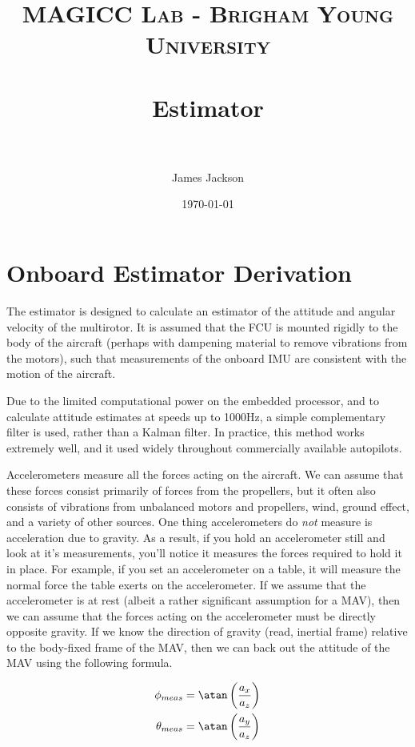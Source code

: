 \documentclass[paper=a4, fontsize=11pt]{scrartcl} %
\title{
\normalfont \normalsize
\textsc{MAGICC Lab - Brigham Young University} \\ [25pt] %
\horrule{0.5pt} \\[0.4cm] %
\huge Estimator \\ %
\horrule{2pt} \\[0.5cm] %
}
\author{James Jackson} %
\date{\normalsize\today} %
\numberwithin{equation}{section} %
\numberwithin{figure}{section} %
\numberwithin{table}{section} %
\begin{document}
\maketitle %


\section{Onboard Estimator Derivation}

The estimator is designed to calculate an estimator of the attitude and angular velocity of the multirotor.  It is assumed that the FCU is mounted rigidly to the body of the aircraft (perhaps with dampening material to remove vibrations from the motors), such that measurements of the onboard IMU are consistent with the motion of the aircraft.

Due to the limited computational power on the embedded processor, and to calculate attitude estimates at speeds up to 1000Hz, a simple complementary filter is used, rather than a Kalman filter.  In practice, this method works extremely well, and it used widely throughout commercially available autopilots.

Accelerometers measure all the forces acting on the aircraft.  We can assume that these forces consist primarily of forces from the propellers, but it often also consists of vibrations from unbalanced motors and propellers, wind, ground effect, and a variety of other sources. One thing accelerometers do \textit{not} measure is acceleration due to gravity.  As a result, if you hold an accelerometer still and look at it's measurements, you'll notice it measures the forces required to hold it in place.  For example, if you set an accelerometer on a table, it will measure the normal force the table exerts on the accelerometer.  If we assume that the accelerometer is at rest (albeit a rather significant assumption for a MAV), then we can assume that the forces acting on the accelerometer must be directly opposite gravity.  If we know the direction of gravity (read, inertial frame) relative to the body-fixed frame of the MAV, then we can back out the attitude of the MAV using the following formula.

\begin{equation}
	\begin{aligned}
		\phi_{meas} &= \atan \left( \frac{a_x}{a_z} \right)  \\
		\theta_{meas} &= \atan \left( \frac{a_y}{a_z}  \right)
	\end{aligned}
\end{equation}
\end{document}

